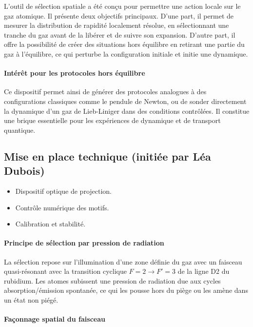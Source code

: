 L’outil de sélection spatiale a été conçu pour permettre une action locale sur le gaz atomique. Il présente deux objectifs principaux. D’une part, il permet de mesurer la distribution de rapidité localement résolue, en sélectionnant une tranche du gaz avant de la libérer et de suivre son expansion. D’autre part, il offre la possibilité de créer des situations hors équilibre en retirant une partie du gaz à l’équilibre, ce qui perturbe la configuration initiale et initie une dynamique.

\paragraph{Intérêt pour les protocoles hors équilibre}

Ce dispositif permet ainsi de générer des protocoles analogues à des configurations classiques comme le pendule de Newton, ou de sonder directement la dynamique d’un gaz de Lieb-Liniger dans des conditions contrôlées. Il constitue une brique essentielle pour les expériences de dynamique et de transport quantique.


\subsection{Mise en place technique (initiée par Léa Dubois)}

{\color{blue}
\begin{itemize}
    \item Dispositif optique de projection.
    \item Contrôle numérique des motifs.
    \item Calibration et stabilité.
\end{itemize}
}

\paragraph{Principe de sélection par pression de radiation}

La sélection repose sur l’illumination d’une zone définie du gaz avec un faisceau quasi-résonant avec la transition cyclique \( F=2 \rightarrow F'=3 \) de la ligne D2 du rubidium. Les atomes subissent une pression de radiation due aux cycles absorption/émission spontanée, ce qui les pousse hors du piège ou les amène dans un état non piégé.

\paragraph{Façonnage spatial du faisceau}

